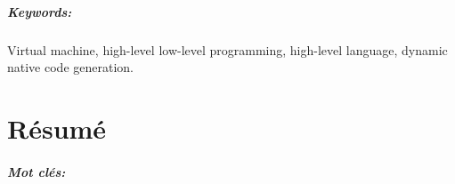 \documentclass[a4paper,11pt,twoside]{include/ThesisStyle}
\begin{document}
\paragraph{Keywords:} Virtual machine, high-level low-level programming, high-level language, dynamic native code generation.

\cleardoublepage
\chapter*{Résumé}

\paragraph{Mot clés:}
 
\renewcommand{\baselinestretch}{1}\normalsize
\tableofcontents

\renewcommand{\baselinestretch}{1.2}\normalsize
\mainmatter
{}



%







\appendix
%





\thispagestyle{empty}
\end{document}
